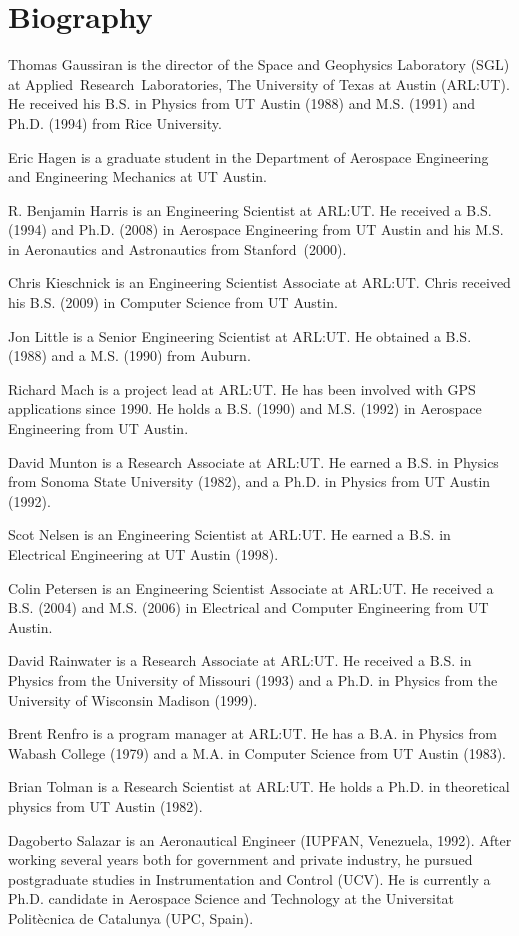 \section*{Biography}

Thomas Gaussiran is the director of the Space and Geophysics
Laboratory (SGL) at  \mbox{Applied Research Laboratories},
The University of Texas at Austin (ARL:UT). He received his B.S. in
Physics from UT Austin (1988) and M.S. (1991) and Ph.D. (1994) from
Rice University.

Eric Hagen is a graduate student in the Department of
Aerospace Engineering and Engineering Mechanics at UT Austin.

R. Benjamin Harris is an Engineering Scientist at ARL:UT.  He received a B.S. (1994) and Ph.D. (2008) in Aerospace Engineering from UT Austin and his M.S. in Aeronautics and Astronautics from \mbox{Stanford (2000)}.

Chris Kieschnick is an Engineering Scientist Associate at ARL:UT. Chris received his B.S. (2009) in Computer Science from UT Austin.

Jon Little is a Senior Engineering Scientist at ARL:UT. He obtained a
B.S. (1988) and a M.S. (1990) from Auburn.

Richard Mach is a project lead at ARL:UT.  He has been involved with
GPS applications since 1990.  He holds a B.S. (1990) and M.S. (1992)
in Aerospace Engineering from UT Austin.

David Munton is a Research Associate at ARL:UT. He earned a B.S. in Physics from Sonoma State University (1982), and a Ph.D. in Physics from UT Austin (1992). 

Scot Nelsen is an Engineering Scientist at ARL:UT. He earned a B.S. in
Electrical Engineering at UT Austin (1998).

Colin Petersen is an Engineering Scientist Associate at ARL:UT. He received a B.S. (2004) and M.S. (2006) in Electrical and Computer Engineering from UT Austin.

David Rainwater is a Research Associate at ARL:UT. He received a B.S. in Physics from the University of Missouri (1993) and a Ph.D. in Physics from the University of Wisconsin Madison (1999).

Brent Renfro is a program manager at ARL:UT.  He has a B.A. in Physics from Wabash College (1979) and a M.A. in Computer Science from UT Austin (1983).

Brian Tolman is a Research Scientist at ARL:UT. He holds a
Ph.D. in theoretical physics from UT Austin (1982).

Dagoberto Salazar is an Aeronautical Engineer (IUPFAN, Venezuela, 1992). After working several years both for government and private industry, he pursued postgraduate studies in Instrumentation and Control (UCV). He is currently a Ph.D. candidate in Aerospace Science and Technology at the Universitat Polit\`{e}cnica de Catalunya (UPC, Spain).

